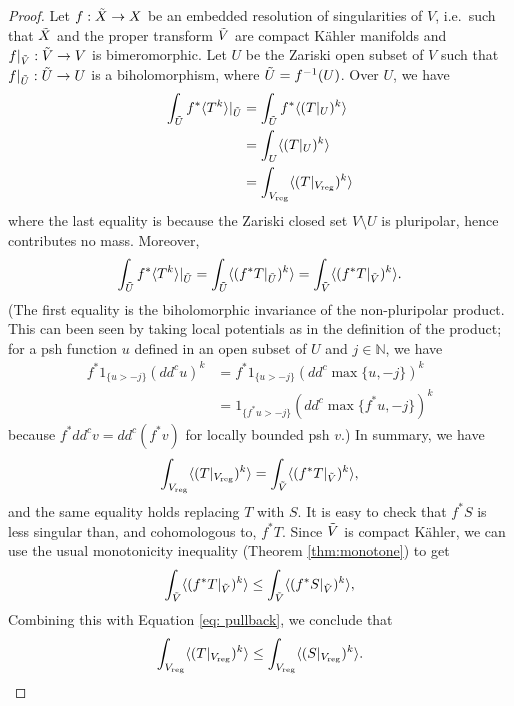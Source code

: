 \documentclass[10pt,a4paper]{amsart}
\newcommand{\N}{\mathbb{N}}
\newcommand{\inv}{^{-1}}
\newcommand{\reg}{{\operatorname{reg}}}
\begin{document}
\begin{proof}
    Let $f: \Tilde{X} \to X$ be an embedded resolution of singularities of $V$, i.e.\ such that $\Tilde{X}$ and the proper transform $\Tilde{V}$ are compact K\"ahler manifolds and $f|_{\Tilde{V}}: \Tilde{V} \to V$ is bimeromorphic. Let $U$ be the Zariski open subset of $V$ such that $f|_{\Tilde{U}}: \Tilde{U} \to U$ is a biholomorphism, where $\Tilde{U} = f\inv(U)$. Over $U$, we have
    \begin{align*}
        \int_{\Tilde{U}} f^*\langle T^k\rangle|_{\Tilde{U}} &= \int_{\Tilde{U}} f^*\langle (T|_U)^k\rangle\\
        &= \int_U\langle (T|_U)^k\rangle\\
        &= \int_{V_\reg}\langle (T|_{V_\reg})^k\rangle
    \end{align*} 
    where the last equality is because the Zariski closed set $V\setminus U$ is pluripolar, hence contributes no mass. Moreover,
       \[\int_{\Tilde{U}} f^*\langle T^k\rangle|_{\Tilde{U}}  = \int_{\Tilde{U}}\langle (f^*T|_{\Tilde{U}})^k\rangle = \int_{\Tilde{V}}\langle (f^*T|_{\Tilde{V}})^k\rangle.\]
       (The first equality is the biholomorphic invariance of the non-pluripolar product. This can been seen by taking local potentials as in the definition of the product; for a psh function $u$ defined in an open subset of $U$ and $j\in \N$, we have
       \begin{align*}
           f^*1_{\{u > -j\}}(dd^cu)^k &= f^*1_{\{u > -j\}} (dd^c\max\{u, -j\})^k\\ &= 1_{\{f^*u > -j\}}(dd^c\max\{f^*u, -j\})^k
       \end{align*}
       because $f^*dd^cv = dd^c(f^*v)$ for locally bounded psh $v$.)
       In summary, we have
    \begin{equation}\label{eq: pullback}
        \int_{V_\reg}\langle (T|_{V_\reg})^k\rangle = \int_{\Tilde{V}}\langle (f^*T|_{\Tilde{V}})^k\rangle,
    \end{equation}
    and the same equality holds replacing $T$ with $S$. It is easy to check that $f^*S$ is less singular than, and cohomologous to, $f^*T$. Since $\Tilde{V}$ is compact K\"ahler, we can use the usual monotonicity inequality (Theorem \ref{thm:monotone}) to get
    \[\int_{\Tilde{V}}\langle (f^* T|_{\Tilde{V}})^k\rangle \le \int_{\Tilde{V}}\langle (f^* S|_{\Tilde{V}})^k\rangle,\]
    Combining this with Equation \eqref{eq: pullback}, we conclude that
    \[\int_{V_\reg} \langle(T|_{V_\reg})^k\rangle \le \int_{V_\reg} \langle(S|_{V_\reg})^k\rangle.\qedhere\]
\end{proof}
\end{document}
